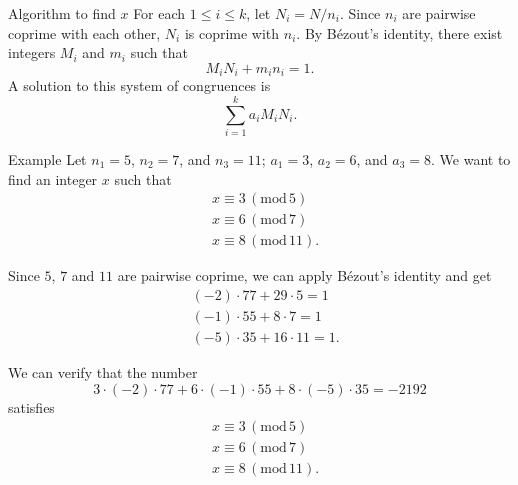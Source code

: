 \documentclass[professionalfont, 12pt, handout, t]{beamer} %
\theoremstyle{plain}
\theoremstyle{definition}
\newcommand{\Mod}[1]{\, (\mathrm{mod} \, #1)}
\begin{document}
\begin{frame}{Algorithm to find $x$}
    For each $1 \leq i \leq k$, let $N_i = N/n_i$.
    Since $n_i$ are pairwise coprime with each other, $N_i$ is coprime with $n_i$.
    By B\'{e}zout's identity, there exist integers $M_i$ and $m_i$ such that
    \[
        M_i N_i + m_i n_i = 1.
    \]
    A solution to this system of congruences is
    \[
        \sum\limits_{i = 1}^k a_i M_i N_i.
    \]
\end{frame}

\begin{frame}{Example}
    Let $n_1 = 5$, $n_2 = 7$, and $n_3 = 11$; $a_1 = 3$, $a_2 = 6$, and $a_3 = 8$.
    We want to find an integer $x$ such that
    \begin{align*}
        & x \equiv 3 \Mod {5}\\
        & x \equiv 6 \Mod {7}\\
        & x \equiv 8 \Mod {11}.
    \end{align*}
\end{frame}

\begin{frame}{}
    Since $5$, $7$ and $11$ are pairwise coprime, we can apply B\'{e}zout's identity and get
    \begin{align*}
        & (-2) \cdot 77 + 29 \cdot 5 = 1\\
        & (-1) \cdot 55 + 8 \cdot 7 = 1\\
        & (-5) \cdot 35 + 16 \cdot 11 = 1.
    \end{align*}
    \pause
    
    We can verify that the number
    \[
        3 \cdot (-2) \cdot 77 + 6 \cdot (-1) \cdot 55 + 8 \cdot (-5) \cdot 35 = -2192 
    \]
    satisfies 
    \begin{align*}
        & x \equiv 3 \Mod {5}\\
        & x \equiv 6 \Mod {7}\\
        & x \equiv 8 \Mod {11}.
    \end{align*}

\end{frame}

    
\end{document}
